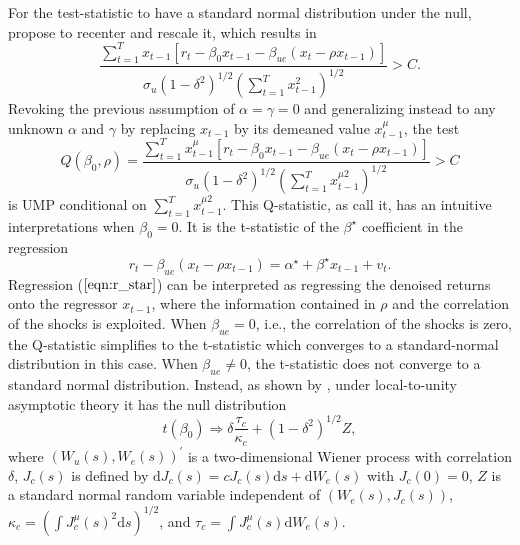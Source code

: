 \documentclass{article}
\begin{document}
For the test-statistic to have a standard normal distribution under the null, \citet{campbell2006efficient} propose to recenter and rescale it, which results in 
\begin{equation}
\frac{\sum_{t=1}^{T} x_{t-1}\left[r_{t}-\beta_{0} x_{t-1}-\beta_{u e}\left(x_{t}-\rho x_{t-1}\right)\right]}{\sigma_{u}\left(1-\delta^{2}\right)^{1 / 2}\left(\sum_{t=1}^{T} x_{t-1}^{2}\right)^{1 / 2}}>C.
\end{equation}
Revoking the previous assumption of $\alpha=\gamma=0$ and generalizing instead to any unknown  $\alpha$ and $\gamma$ by replacing $x_{t-1}$ by its demeaned value $x_{t-1}^{\mu}$, the test
\begin{equation}
Q\left(\beta_{0}, \rho\right)=\frac{\sum_{t=1}^{T} x_{t-1}^{\mu}\left[r_{t}-\beta_{0} x_{t-1}-\beta_{u e}\left(x_{t}-\rho x_{t-1}\right)\right]}{\sigma_{u}\left(1-\delta^{2}\right)^{1 / 2}\left(\sum_{t=1}^{T} x_{t-1}^{\mu 2}\right)^{1 / 2}}>C
\end{equation}
is UMP conditional on $\sum_{t=1}^{T} x_{t-1}^{\mu 2}$.
This Q-statistic, as \citet{campbell2006efficient} call it, has an intuitive interpretations when $\beta_{0} = 0$. It is the t-statistic of the $\beta^{\star}$ coefficient in the regression
 \begin{equation}
 \label{eqn:r_star}
r_{t}-\beta_{u e}\left(x_{t}-\rho x_{t-1}\right)=\alpha^{\star}+\beta^{\star} x_{t-1}+v_{t}. 
\end{equation}
Regression ($\ref{eqn:r_star}$) can be interpreted as regressing the denoised returns onto the regressor $x_{t-1}$, where the information contained in $\rho$ and the correlation of the shocks is exploited.
When $\beta_{u e}=0$, i.e., the correlation of the shocks is zero, the Q-statistic simplifies to the t-statistic which converges to a standard-normal distribution in this case. When $\beta_{u e}\neq0$, the t-statistic does not converge to a standard normal distribution. Instead, as shown by \citet{elliott1994inference}, under local-to-unity asymptotic theory it has the null distribution 
\begin{equation}
\label{lua_t}
t\left(\beta_{0}\right) \Rightarrow \delta \frac{\tau_{c}}{\kappa_{c}}+\left(1-\delta^{2}\right)^{1 / 2} Z,
\end{equation}
where $\left(W_{u}(s), W_{e}(s)\right)^{\prime}$ is a two-dimensional Wiener process with correlation $\delta$, $J_{c}(s)$ is defined by $\mathrm{d} J_{c}(s)=c J_{c}(s) \mathrm{d} s+\mathrm{d} W_{e}(s)$ with $J_{c}(0)=0$, $Z$ is a standard normal random variable independent of $\left(W_{e}(s), J_{c}(s)\right)$, $\kappa_{c}=\left(\int J_{c}^{\mu}(s)^{2} \mathrm{d} s\right)^{1 / 2}$, and $\tau_{c}=\int J_{c}^{\mu}(s) \mathrm{d} W_{e}(s)$.
\end{document}
